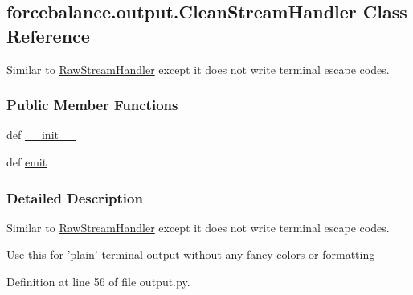 \hypertarget{classforcebalance_1_1output_1_1CleanStreamHandler}{\subsection{forcebalance.\-output.\-Clean\-Stream\-Handler \-Class \-Reference}
\label{classforcebalance_1_1output_1_1CleanStreamHandler}
}


\-Similar to \hyperlink{classforcebalance_1_1output_1_1RawStreamHandler}{\-Raw\-Stream\-Handler} except it does not write terminal escape codes.  


\subsubsection*{\-Public \-Member \-Functions}
\begin{DoxyCompactItemize}
\item 
def \hyperlink{classforcebalance_1_1output_1_1CleanStreamHandler_af3e4e5c143659317693cfd5e6c4098d5}{\-\_\-\-\_\-init\-\_\-\-\_\-}
\item 
def \hyperlink{classforcebalance_1_1output_1_1CleanStreamHandler_a54af06d396c934827a60c07319b61c9b}{emit}
\end{DoxyCompactItemize}


\subsubsection{\-Detailed \-Description}
\-Similar to \hyperlink{classforcebalance_1_1output_1_1RawStreamHandler}{\-Raw\-Stream\-Handler} except it does not write terminal escape codes. 

\-Use this for 'plain' terminal output without any fancy colors or formatting 

\-Definition at line 56 of file output.\-py.




